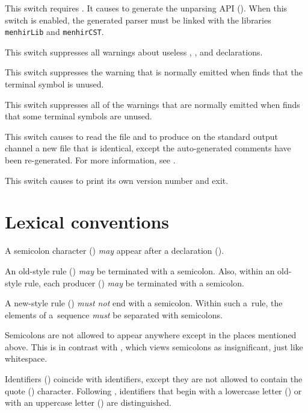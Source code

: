 \documentclass[onecolumn,11pt,nocopyrightspace,preprint]{sigplanconf}
\begin{document}
\docswitch{\ounparsing} This switch requires \otable. It causes \menhir to
generate the unparsing API (). When this switch is
enabled, the generated parser must be linked with the libraries
\texttt{menhirLib} and \texttt{menhirCST}.

\docswitch{\oignoreprec} This switch suppresses all warnings about
useless \dleft, \dright, \dnonassoc and \dprec declarations.

 This switch suppresses the warning that
is normally emitted when \menhir finds that the terminal symbol  is
unused.

\docswitch{\oignoreall} This switch suppresses all of the warnings that are
normally emitted when \menhir finds that some terminal symbols are unused.

 This switch causes \menhir to
read the \messages file  and to produce on the standard output
channel a new \messages file that is identical, except the auto-generated
comments have been re-generated. For more information,
see .

\docswitch{\oversion} This switch causes \menhir to print its own version
number and exit.


\section{Lexical conventions}

A semicolon character (\kw{;}) \emph{may} appear after a declaration
().

An old-style rule () \emph{may} be terminated with a
semicolon. Also, within an old-style rule, each producer
() \emph{may} be terminated with a semicolon.

A new-style rule () \emph{must not} end with a
semicolon. Within such a~rule, the elements of a~sequence \emph{must} be
separated with semicolons.

Semicolons are not allowed to appear anywhere except in the places mentioned
above. This is in contrast with \ocamlyacc, which views semicolons as
insignificant, just like whitespace.

Identifiers () coincide with \ocaml identifiers, except they are not
allowed to contain the quote () character. Following
\ocaml, identifiers that begin with a lowercase letter
() or with an uppercase letter () are distinguished.
\end{document}
